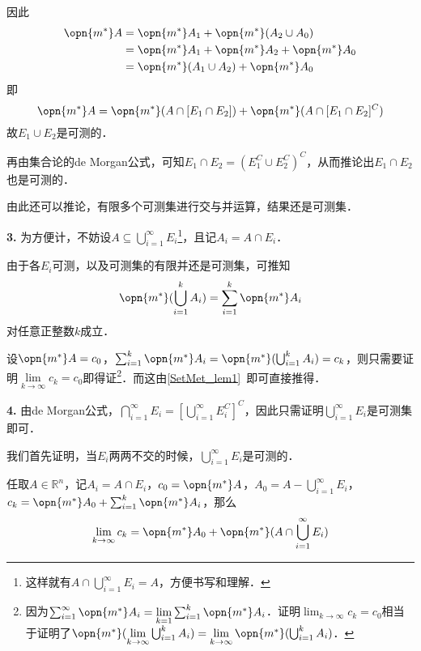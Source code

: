 因此
\begin{equation}
\begin{aligned}
\opn{m^*}A&=\opn{m^*}A_1+\opn{m^*}(A_2\cup A_0)\\
&=\opn{m^*}A_1+\opn{m^*}A_2+\opn{m^*}A_0\\
&=\opn{m^*}(A_1\cup A_2)+\opn{m^*}A_0
\end{aligned}
\end{equation}
即
\begin{equation}
\opn{m^*}A=\opn{m^*}(A\cap [E_1\cap E_2])+\opn{m^*}(A\cap [E_1\cap E_2]^C)
\end{equation}
故$E_1\cup E_2$是可测的．

再由集合论的de Morgan公式，可知$E_1\cap E_2=(E_1^C\cup E_2^C)^C$，从而推论出$E_1\cap E_2$也是可测的．

由此还可以推论，有限多个可测集进行交与并运算，结果还是可测集．

\textbf{3.} 为方便计，不妨设$A\subseteq \bigcup_{i=1}^\infty E_i$\footnote{这样就有$A\cap \bigcup_{i=1}^{\infty}E_i=A$，方便书写和理解．}，且记$A_i=A\cap E_i$．

由于各$E_i$可测，以及可测集的有限并还是可测集，可推知
\begin{equation}
\opn{m^*}(\bigcup_{i=1}^k A_i)=\sum_{i=1}^k \opn{m^*}A_i
\end{equation}
对任意正整数$k$成立．

设$\opn{m^*}A=c_0$，$\sum_{i=1}^k \opn{m^*}A_i=\opn{m^*}(\bigcup_{i=1}^k A_i)=c_k$，则只需要证明$\lim\limits_{k\to \infty}c_k=c_0$即得证\footnote{因为$\sum_{i=1}^\infty \opn{m^*}A_i=\lim\limits_{k=1}\sum_{i=1}^k\opn{m^*}A_i$．证明$\lim_{k\to\infty}c_k=c_0$相当于证明了$\opn{m^*}(\lim\limits_{k\to\infty}\bigcup^k_{i=1}A_i)=\lim\limits_{k\to\infty}\opn{m^*}(\bigcup^k_{i=1}A_i)$．}．而这由\autoref{SetMet_lem1}~即可直接推得．%

\textbf{4.} 由de Morgan公式，$\bigcap_{i=1}^\infty E_i=[\bigcup_{i=1}^\infty E_i^C]^C$，因此只需证明$\bigcup_{i=1}^\infty E_i$是可测集即可．

我们首先证明，当$E_i$两两不交的时候，$\bigcup^\infty_{i=1}E_i$是可测的．

任取$A\in\mathbb{R}^n$，记$A_i=A\cap E_i$，$c_0=\opn{m^*}A$，$A_0=A-\bigcup_{i=1}^\infty E_i$，$c_k=\opn{m^*}A_0+\sum_{i=1}^k\opn{m^*}A_i$，那么
\begin{equation}
\lim\limits_{k\to \infty}c_k=\opn{m^*}A_0+\opn{m^*}(A\cap\bigcup_{i=1}^\infty E_i)
\end{equation}

